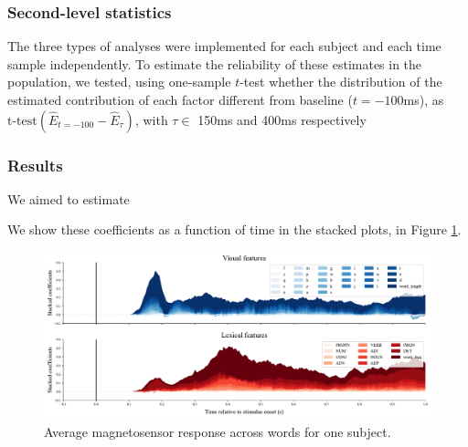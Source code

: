 
\subsubsection{Second-level statistics}

The three types of analyses were implemented for each subject and each time
sample independently.  To estimate the reliability of these estimates in the
population, we tested, using one-sample $t$-test whether the distribution of
the estimated contribution of each factor different from baseline ($t=-100$ms),
as $\text{t-test}(\hat E_{t=-100} - \hat E_{\tau})$, with $\tau \in $ 150ms and
400ms respectively


\subsubsection{Results}

We aimed to estimate

We show these coefficients as a function of time in the stacked plots, in Figure
\ref{fig:megresult}.

\begin{figure}
  \centering
  \includegraphics[width=\textwidth, trim=0cm 0cm 0cm 0cm, clip=True]{figures/meg_result.pdf}
  \caption{Average magnetosensor response across words for one subject.}
  \label{fig:megresult}
\end{figure}
